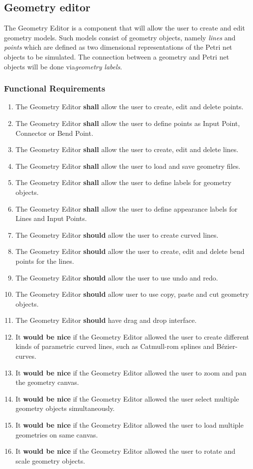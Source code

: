 \subsection{Geometry editor}
\label{sec:sf-geometry}

The Geometry Editor is a component that will allow the user to create and edit geometry models. Such models consist of geometry objects, namely \textit{lines} and \textit{points} which are defined as two dimensional representations of the Petri net objects to be simulated. The connection between a geometry and Petri net objects will be done via\textit{geometry labels}.

\subsubsection{Functional Requirements}

\begin{enumerate}
	\item The Geometry Editor \textbf{shall} allow the user to create, edit and delete points.
	\item The Geometry Editor \textbf{shall} allow the user to define points as Input Point, Connector or Bend Point.
	\item The Geometry Editor \textbf{shall} allow the user to create, edit and delete lines.
	\item The Geometry Editor \textbf{shall} allow the user to load and save geometry files.
	\item The Geometry Editor \textbf{shall} allow the user to define labels for geometry objects.
	\item The Geometry Editor \textbf{shall} allow the user to define appearance labels for Lines and Input Points.
	\item The Geometry Editor \textbf{should} allow the user to create curved lines.
	\item The Geometry Editor \textbf{should} allow the user to create, edit and delete bend points for the lines.
	\item The Geometry Editor \textbf{should} allow the user to use undo and redo.
	\item The Geometry Editor \textbf{should} allow user to use copy, paste and cut geometry objects.
	\item The Geometry Editor \textbf{should} have drag and drop interface.
	\item It \textbf{would be nice} if the Geometry Editor allowed the user to create different kinds of parametric curved lines, such as Catmull-rom splines and Bézier-curves.
	\item It \textbf{would be nice} if the Geometry Editor allowed the user to zoom and pan the geometry canvas.
	\item It \textbf{would be nice} if the Geometry Editor allowed the user select multiple geometry objects simultaneously.
	\item It \textbf{would be nice} if the Geometry Editor allowed the user to load multiple geometries on same canvas.
	\item It \textbf{would be nice} if the Geometry Editor allowed the user to rotate and scale geometry objects.
\end{enumerate}

